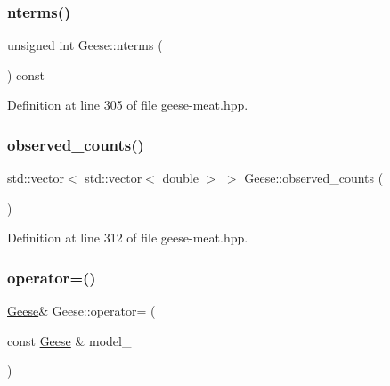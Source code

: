 \mbox{\label{class_geese_a0bfdc90924ef14433df93dd866a28126}} 
\subsubsection{\texorpdfstring{nterms()}{nterms()}}
{\footnotesize\ttfamily unsigned int Geese\+::nterms (\begin{DoxyParamCaption}{ }\end{DoxyParamCaption}) const\hspace{0.3cm}{\ttfamily [inline]}}



Definition at line 305 of file geese-\/meat.\+hpp.

\mbox{\label{class_geese_a82def7c8a870aa1b3ec069099c01fe02}} 
\subsubsection{\texorpdfstring{observed\+\_\+counts()}{observed\_counts()}}
{\footnotesize\ttfamily std\+::vector$<$ std\+::vector$<$ double $>$ $>$ Geese\+::observed\+\_\+counts (\begin{DoxyParamCaption}{ }\end{DoxyParamCaption})\hspace{0.3cm}{\ttfamily [inline]}}



Definition at line 312 of file geese-\/meat.\+hpp.

\mbox{\label{class_geese_a857663144d377cd5ee69960267865eaa}} 
\subsubsection{\texorpdfstring{operator=()}{operator=()}\hspace{0.1cm}{\footnotesize\ttfamily [1/2]}}
{\footnotesize\ttfamily \hyperlink{class_geese}{Geese}\& Geese\+::operator= (\begin{DoxyParamCaption}\item[{const \hyperlink{class_geese}{Geese} \&}]{model\+\_\+ }\end{DoxyParamCaption})\hspace{0.3cm}{\ttfamily [delete]}}

